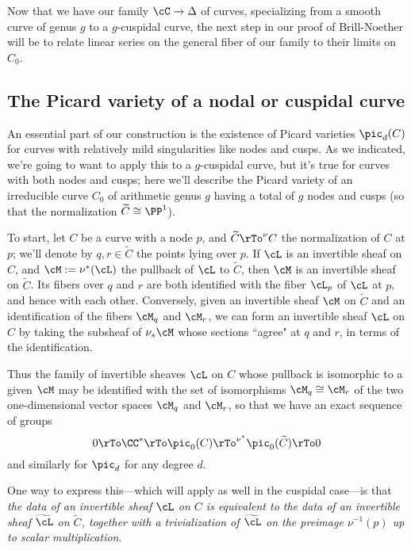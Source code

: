 Now that we have our family $\cC \to \Delta$ of curves, specializing from a smooth curve of genus $g$ to a $g$-cuspidal curve, the next step in our proof of Brill-Noether will be to relate linear series on the general fiber of our family to their limits on $C_0$.

\subsection{The Picard variety of a nodal or cuspidal curve}

An essential part of our construction is the existence of Picard varieties $\pic_d(C)$ for curves with relatively mild singularities like nodes and cusps. As we indicated, we're going to want to apply this to a $g$-cuspidal curve, but it's true for curves with both nodes and cusps; here we'll describe the Picard variety of an irreducible curve $C_0$ of arithmetic genus $g$ having a total of $g$ nodes and cusps (so that the normalization $\widetilde C \cong \PP^1$).

To start, let $C$ be a curve with a node $p$, and $\widetilde C \rTo^\nu C$ the normalization of $C$ at $p$; we'll denote by $q,r \in \widetilde C$ the points lying over $p$. If $\cL$ is an invertible sheaf on $C$, and $\cM := \nu^*(\cL)$ the pullback of $\cL$ to $\widetilde C$, then $\cM$ is an invertible sheaf on $\widetilde C$. Its fibers over $q$ and $r$ are both identified with the fiber $\cL_p$ of $\cL$ at $p$, and hence with each other. Conversely, given an invertible sheaf $\cM$ on $\widetilde C$ and an identification of the fibers $\cM_q$ and $\cM_r$, we can form an invertible sheaf $\cL$ on $C$ by taking the subsheaf of $\nu_*\cM$ whose sections ``agree" at $q$ and $r$, in terms of the identification. 

Thus the family of invertible sheaves $\cL$ on $C$ whose pullback is isomorphic to a given $\cM$ may be identified with the set of isomorphisms $\cM_q \cong \cM_r$ of the two one-dimensional vector spaces $\cM_q$ and $\cM_r$, so that  we have an exact sequence of groups
$$
0 \rTo  \CC^* \rTo \pic_0(C) \rTo^{\nu^*}  \pic_0(\widetilde C) \rTo 0
$$
and similarly for $\pic_d$ for any degree $d$.

One way to express this---which will apply as well in the cuspidal case---is that \emph{the data of an invertible sheaf $\cL$ on $C$ is equivalent to the data of an invertible sheaf $\widetilde \cL$ on $\widetilde C$, together with a trivialization of $\widetilde \cL$ on the preimage $\nu^{-1}(p)$ up to scalar multiplication}.



